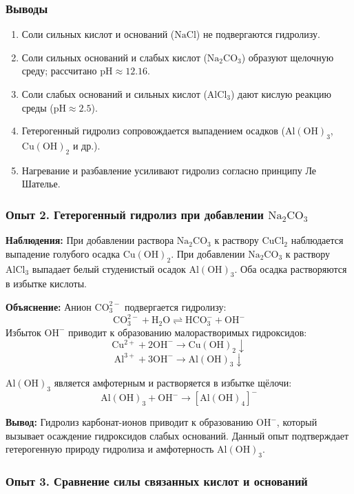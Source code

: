 \documentclass[a4paper,12pt]{article}
\begin{document}
	\subsubsection*{Выводы}
	\begin{enumerate}
		\item Соли сильных кислот и оснований ($\mathrm{NaCl}$) не подвергаются гидролизу.
		\item Соли сильных оснований и слабых кислот ($\mathrm{Na_2CO_3}$) образуют щелочную среду; рассчитано pH$\approx12.16$.
		\item Соли слабых оснований и сильных кислот ($\mathrm{AlCl_3}$) дают кислую реакцию среды (pH$\approx2.5$).
		\item Гетерогенный гидролиз сопровождается выпадением осадков ($\mathrm{Al(OH)_3}$, $\mathrm{Cu(OH)_2}$ и др.).
		\item Нагревание и разбавление усиливают гидролиз согласно принципу Ле Шателье.
	\end{enumerate}
	
	\subsubsection*{Опыт 2. Гетерогенный гидролиз при добавлении $\mathrm{Na_2CO_3}$}
	
	\textbf{Наблюдения:}
	При добавлении раствора $\mathrm{Na_2CO_3}$ к раствору $\mathrm{CuCl_2}$ наблюдается выпадение 
	голубого осадка $\mathrm{Cu(OH)_2}$. 
	При добавлении $\mathrm{Na_2CO_3}$ к раствору $\mathrm{AlCl_3}$ выпадает белый студенистый осадок $\mathrm{Al(OH)_3}$. 
	Оба осадка растворяются в избытке кислоты.
	
	\textbf{Объяснение:}
	Анион $\mathrm{CO_3^{2-}}$ подвергается гидролизу:
	\[
	\mathrm{CO_3^{2-} + H_2O \rightleftharpoons HCO_3^- + OH^-}
	\]
	Избыток $\mathrm{OH^-}$ приводит к образованию малорастворимых гидроксидов:
	\[
	\mathrm{Cu^{2+} + 2OH^- \rightarrow Cu(OH)_2 \downarrow}
	\]
	\[
	\mathrm{Al^{3+} + 3OH^- \rightarrow Al(OH)_3 \downarrow}
	\]
	
	$\mathrm{Al(OH)_3}$ является амфотерным и растворяется в избытке щёлочи:
	\[
	\mathrm{Al(OH)_3 + OH^- \rightarrow [Al(OH)_4]^-}
	\]
	
	\textbf{Вывод:} 
	Гидролиз карбонат-ионов приводит к образованию $\mathrm{OH^-}$, который вызывает 
	осаждение гидроксидов слабых оснований. Данный опыт подтверждает 
	гетерогенную природу гидролиза и амфотерность $\mathrm{Al(OH)_3}$.
	
	\subsubsection*{Опыт 3. Сравнение силы связанных кислот и оснований}
	
\end{document}
